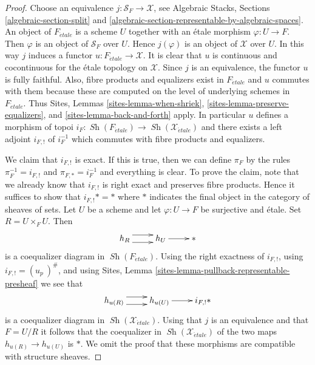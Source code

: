 \documentclass[10pt,a4paper]{amsart}
\theoremstyle{plain}
\theoremstyle{definition}
\theoremstyle{remark}
\numberwithin{equation}{subsection}
\def\Sh{\mathop{\mathit{Sh}}\nolimits}
\def\etale{{\acute{e}tale}}
\begin{document}
\begin{proof}
Choose an equivalence $j : \mathcal{S}_F \to \mathcal{X}$, see
Algebraic Stacks, Sections \ref{algebraic-section-split} and
\ref{algebraic-section-representable-by-algebraic-spaces}.
An object of $F_\etale$ is a scheme $U$ together with an
\'etale morphism $\varphi : U \to F$. Then $\varphi$ is an object
of $\mathcal{S}_F$ over $U$. Hence $j(\varphi)$ is an object of
$\mathcal{X}$ over $U$. In this way $j$ induces a functor
$u : F_\etale \to \mathcal{X}$. It is clear that
$u$ is continuous and cocontinuous for the \'etale topology on
$\mathcal{X}$. Since $j$ is an equivalence, the functor $u$ is fully
faithful. Also, fibre products and equalizers exist in $F_\etale$
and $u$ commutes with them because these are computed on the level
of underlying schemes in $F_\etale$. Thus
Sites, Lemmas \ref{sites-lemma-when-shriek},
\ref{sites-lemma-preserve-equalizers}, and
\ref{sites-lemma-back-and-forth}
apply. In particular $u$ defines a morphism of topoi
$i_F : \Sh(F_\etale) \to \Sh(\mathcal{X}_\etale)$
and there exists a left adjoint $i_{F, !}$ of $i_F^{-1}$ which commutes
with fibre products and equalizers.

\medskip\noindent
We claim that $i_{F, !}$ is exact. If this is true, then we can define
$\pi_F$ by the rules $\pi_F^{-1} = i_{F, !}$ and $\pi_{F, *} = i_F^{-1}$
and everything is clear. To prove the claim, note that we already know
that $i_{F, !}$
is right exact and preserves fibre products. Hence it suffices to show
that $i_{F, !}* = *$ where $*$ indicates the final object in the category
of sheaves of sets. Let $U$ be a scheme and let
$\varphi : U \to F$ be surjective and \'etale. Set $R = U \times_F U$.
Then
$$
\xymatrix{
h_R \ar@<1ex>[r] \ar@<-1ex>[r] & h_U \ar[r] & {*}
}
$$
is a coequalizer diagram in $\Sh(F_\etale)$. Using the
right exactness of $i_{F, !}$, using $i_{F, !} = (u_p\ )^\#$, and using
Sites, Lemma \ref{sites-lemma-pullback-representable-presheaf}
we see that
$$
\xymatrix{
h_{u(R)} \ar@<1ex>[r] \ar@<-1ex>[r] & h_{u(U)} \ar[r] & i_{F, !}{*}
}
$$
is a coequalizer diagram in $\Sh(\mathcal{X}_\etale)$. Using that
$j$ is an equivalence and that $F = U/R$ it follows that
the coequalizer in $\Sh(\mathcal{X}_\etale)$ of the
two maps $h_{u(R)} \to h_{u(U)}$ is $*$. We omit the proof that
these morphisms are compatible with structure sheaves.
\end{proof}
\end{document}
